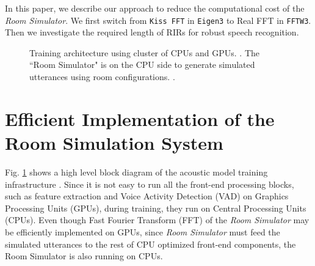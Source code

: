 \documentclass{article}
\begin{document}
In this paper, we describe our approach to reduce the
computational cost of the \textit{Room Simulator}. We
first switch from \texttt{Kiss FFT} in
\texttt{Eigen3} to Real FFT in \texttt{FFTW3}. Then we
investigate the required length of RIRs for robust
speech recognition.
%
%
%
%
%
\begin{figure}%
  \begin{center}
    \resizebox{85mm}{!}{}
      \caption {
        \label{fig:gpu_cpu_structure}
        Training architecture using cluster of CPUs and GPUs.
        \cite{E_Variani_INTERSPEECH_2017_01}.
        The ``Room Simulator" is on the CPU side to generate
        simulated utterances using room configurations.
        \cite{C_Kim_INTERSPEECH_2017_1}.}
  \end{center}
\vspace{-10mm}
\end{figure}
%
%
%
%
\section{Efficient Implementation of the Room Simulation System}
  \label{sec:implementation}
%
Fig. \ref{fig:gpu_cpu_structure} shows a high level block diagram of
the acoustic model training infrastructure
\cite{E_Variani_INTERSPEECH_2017_01}. Since it is not easy to
run all the front-end processing blocks, such as feature
extraction and Voice Activity Detection (VAD) on Graphics
Processing Units (GPUs), during training, they run on Central Processing
Units (CPUs). Even though Fast Fourier Transform (FFT) of the
\textit{Room Simulator} may be efficiently implemented on GPUs,
since
\textit{Room Simulator} must feed the simulated utterances
to the rest of CPU optimized front-end components, the Room Simulator
is also running on CPUs.
%
%
%
%
\end{document}
